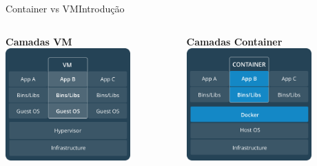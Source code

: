 \documentclass[10pt]{beamer}
\begin{document}
\begin{frame}{Container vs VM}{Introdução}
    \begin{columns}
    \begin{column}{0.5\textwidth}
        \centering
        \textbf{Camadas VM}\\
        \includegraphics[width=0.75\textwidth]{AAUgraphics/camadas_vm.png}
    \end{column}
    \begin{column}{0.5\textwidth}  %
        \centering
        \textbf{Camadas Container}\\
        \includegraphics[width=0.75\textwidth]{AAUgraphics/camadas_container.png}
    \end{column}
    \end{columns}
\end{frame}
\end{document}

